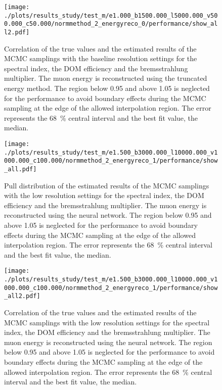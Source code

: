 \begin{figure}
    \centering
    \texttt{[image: ./plots/results\_study/test\_m/e1.000\_b1500.000\_l5000.000\_v500.000\_c50.000/normmethod\_2\_energyreco\_0/performance/show\_all2.pdf]}
    \caption{Correlation of the true values and the estimated results of the MCMC samplings with the baseline resolution settings for the spectral index, the DOM efficiency and the bremsstrahlung multiplier. The muon energy is reconstructed using the truncated energy method. The region below 0.95 and above 1.05 is neglected for the performance to avoid boundary effects during the MCMC sampling at the edge of the allowed interpolation region. The error represents the \SI{68}{\%} central interval and the best fit value, the median.}
    \label{fig:study_result_corr_base_te}
\end{figure}


%

\begin{figure}
    \centering
    \texttt{[image: ./plots/results\_study/test\_m/e1.500\_b3000.000\_l10000.000\_v1000.000\_c100.000/normmethod\_2\_energyreco\_1/performance/show\_all.pdf]}
    \caption{Pull distribution of the estimated results of the MCMC samplings with the low resolution settings for the spectral index, the DOM efficiency and the bremsstrahlung multiplier. The muon energy is reconstructed using the neural network. The region below 0.95 and above 1.05 is neglected for the performance to avoid boundary effects during the MCMC sampling at the edge of the allowed interpolation region. The error represents the \SI{68}{\%} central interval and the best fit value, the median.}
    \label{fig:study_result_pull_low_nn}
\end{figure}

\begin{figure}
    \centering
    \texttt{[image: ./plots/results\_study/test\_m/e1.500\_b3000.000\_l10000.000\_v1000.000\_c100.000/normmethod\_2\_energyreco\_1/performance/show\_all2.pdf]}
    \caption{Correlation of the true values and the estimated results of the MCMC samplings with the low resolution settings for the spectral index, the DOM efficiency and the bremsstrahlung multiplier. The muon energy is reconstructed using the neural network. The region below 0.95 and above 1.05 is neglected for the performance to avoid boundary effects during the MCMC sampling at the edge of the allowed interpolation region. The error represents the \SI{68}{\%} central interval and the best fit value, the median.}
    \label{fig:study_result_corr_low_nn}
\end{figure}

